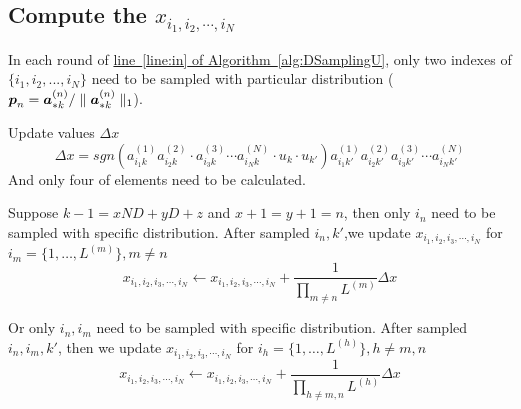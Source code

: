 \documentclass{article}
\newcommand{\Sca}[3]{{#1}^{(#2)}_{i_#2#3}}%
\newcommand{\V}[1]{{\bm{{\MakeLowercase{#1}}}}}%
\newcommand{\Vacol}[1]{\V{a}^{(#1)}_{*k}}
\newcommand{\norm}[2]{\parallel#1\parallel_{#2}}
\newcommand{\AlgLine}[2]{\hyperref[alg:#1]{line~\ref*{line:#2} of Algorithm~\ref*{alg:#1}}}
\begin{document}
\subsection{Compute the $x_{i_1,i_2,\cdots,i_N}$}
\begin{asparaitem}
\item
In each round of \AlgLine{DSamplingU}{in}, only two indexes of $\{i_1,i_2,...,i_N\}$ need to be sampled with particular distribution ($\V{p}_n = \Vacol{n}/\norm{\Vacol{n}}{1}$).
\item Update values $\Delta x$\\
\[\Delta x = sgn(\Sca{a}{1}{k}\Sca{a}{2}{k}\cdot\Sca{a}{3}{k}\cdots\Sca{a}{N}{k}\cdot u_k\cdot u_{k'})
\Sca{a}{1}{k'}\Sca{a}{2}{k'}\Sca{a}{3}{k'}\cdots\Sca{a}{N}{k'}\]
And only four of elements need to be calculated.
\item
Suppose $k-1 = xND + yD + z$ and $x+1 = y+1 = n$, then only $i_n$ need to be sampled with specific distribution.
After sampled $i_n,k'$,we update $x_{i_1,i_2,i_3,\cdots,i_N}$ for $i_m = \{1,\ldots,L^{(m)}\},m\neq n$
\[x_{i_1,i_2,i_3,\cdots,i_N}\leftarrow x_{i_1,i_2,i_3,\cdots,i_N} + \frac{1}{\prod_{m\neq n}L^{(m)}}\Delta x\]
\item
Or only $i_n,i_m$ need to be sampled with specific distribution.
After sampled $i_n,i_m,k'$, then we update $x_{i_1,i_2,i_3,\cdots,i_N}$ for $i_h = \{1,\ldots,L^{(h)}\},h\neq m,n$
\[x_{i_1,i_2,i_3,\cdots,i_N}\leftarrow x_{i_1,i_2,i_3,\cdots,i_N} + \frac{1}{\prod_{h\neq m,n}L^{(h)}}\Delta x\]

\end{asparaitem}
\end{document}
